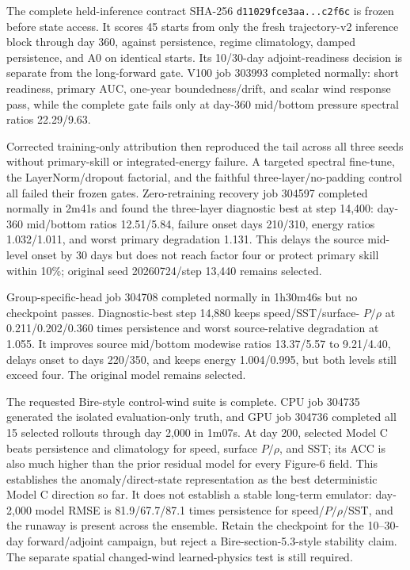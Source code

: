 \documentclass[11pt]{article}
\begin{document}
The complete held-inference contract SHA-256
\texttt{d11029fce3aa...c2f6c} is frozen before state access.  It scores 45 starts
from only the fresh trajectory-v2 inference block through day 360, against
persistence, regime climatology, damped persistence, and A0 on identical starts.
Its 10/30-day adjoint-readiness decision is separate from the long-forward gate.
V100 job 303993 completed normally: short readiness, primary AUC, one-year
boundedness/drift, and scalar wind response pass, while the complete gate fails
only at day-360 mid/bottom pressure spectral ratios 22.29/9.63.

Corrected training-only attribution then reproduced the tail across all three
seeds without primary-skill or integrated-energy failure.  A targeted spectral
fine-tune, the LayerNorm/dropout factorial, and the faithful three-layer/no-padding
control all failed their frozen gates.  Zero-retraining recovery job 304597
completed normally in 2m41s and found the three-layer diagnostic best at step
14,400: day-360 mid/bottom ratios 12.51/5.84, failure onset days 210/310,
energy ratios 1.032/1.011, and worst primary degradation 1.131.  This delays
the source mid-level onset by 30 days but does not reach factor four or protect
primary skill within 10\%; original seed 20260724/step 13,440 remains selected.

Group-specific-head job 304708 completed normally in 1h30m46s but no
checkpoint passes.  Diagnostic-best step 14,880 keeps speed/SST/surface-
\(P/\rho\) at 0.211/0.202/0.360 times persistence and worst source-relative
degradation at 1.055.  It improves source mid/bottom modewise ratios
13.37/5.57 to 9.21/4.40, delays onset to days 220/350, and keeps energy
1.004/0.995, but both levels still exceed four.  The original model remains
selected.

The requested Bire-style control-wind suite is complete.  CPU job 304735
generated the isolated evaluation-only truth, and GPU job 304736 completed
all 15 selected rollouts through day 2,000 in 1m07s.  At day 200, selected
Model C beats persistence and climatology for speed, surface \(P/\rho\), and
SST; its ACC is also much higher than the prior residual model for every
Figure-6 field.  This establishes the anomaly/direct-state representation as
the best deterministic Model C direction so far.  It does not establish a
stable long-term emulator: day-2,000 model RMSE is 81.9/67.7/87.1 times
persistence for speed/\(P/\rho\)/SST, and the runaway is present across the
ensemble.  Retain the checkpoint for the 10--30-day forward/adjoint campaign,
but reject a Bire-section-5.3-style stability claim.  The separate spatial
changed-wind learned-physics test is still required.
\end{document}

